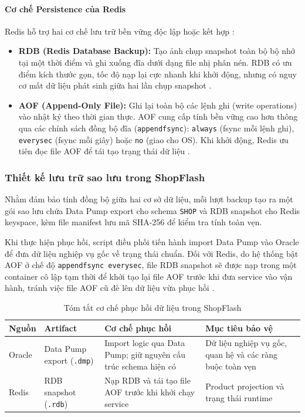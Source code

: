 \paragraph{Cơ chế Persistence của Redis}

Redis hỗ trợ hai cơ chế lưu trữ bền vững độc lập hoặc kết hợp \cite{redisPersistence}:
\begin{itemize}[label=--]
    \item \textbf{RDB (Redis Database Backup):} Tạo ảnh chụp snapshot toàn bộ bộ nhớ tại một thời điểm và ghi xuống đĩa dưới dạng file nhị phân nén. RDB có ưu điểm kích thước gọn, tốc độ nạp lại cực nhanh khi khởi động, nhưng có nguy cơ mất dữ liệu phát sinh giữa hai lần chụp snapshot \cite{redisPersistence}.
    \item \textbf{AOF (Append-Only File):} Ghi lại toàn bộ các lệnh ghi (write operations) vào nhật ký theo thời gian thực. AOF cung cấp tính bền vững cao hơn thông qua các chính sách đồng bộ đĩa (\texttt{appendfsync}): \texttt{always} (fsync mỗi lệnh ghi), \texttt{everysec} (fsync mỗi giây) hoặc \texttt{no} (giao cho OS). Khi khởi động, Redis ưu tiên đọc file AOF để tái tạo trạng thái dữ liệu \cite{redisPersistence}.
\end{itemize}

\subsubsection{Thiết kế lưu trữ sao lưu trong ShopFlash}

Nhằm đảm bảo tính đồng bộ giữa hai cơ sở dữ liệu, mỗi lượt backup tạo ra một gói sao lưu chứa Data Pump export cho schema \texttt{SHOP} và RDB snapshot cho Redis keyspace, kèm file manifest lưu mã SHA-256 để kiểm tra tính toàn vẹn.

Khi thực hiện phục hồi, script điều phối tiến hành import Data Pump vào Oracle để đưa dữ liệu nghiệp vụ gốc về trạng thái chuẩn. Đối với Redis, do hệ thống bật AOF ở chế độ \texttt{appendfsync everysec}, file RDB snapshot sẽ được nạp trong một container cô lập tạm thời để khởi tạo lại file AOF trước khi đưa service vào vận hành, tránh việc file AOF cũ đè lên dữ liệu vừa phục hồi \cite{redisPersistence}.

\begin{table}[H]
    \centering
    \caption{Tóm tắt cơ chế phục hồi dữ liệu trong ShopFlash}
    \label{tab:bk-backup-artifacts}
    \begin{tabularx}{\textwidth}{@{}p{}p{}XX@{}}
        \toprule
        Nguồn & Artifact & Cơ chế phục hồi & Mục tiêu bảo vệ \\
        \midrule
        Oracle & Data Pump export (\texttt{.dmp}) & Import logic qua Data Pump; giữ nguyên cấu trúc schema hiện có & Dữ liệu nghiệp vụ gốc, quan hệ và các ràng buộc toàn vẹn \\
        Redis & RDB snapshot (\texttt{.rdb}) & Nạp RDB và tái tạo file AOF trước khi khởi chạy service & Product projection và trạng thái runtime \\
        \bottomrule
    \end{tabularx}
\end{table}

